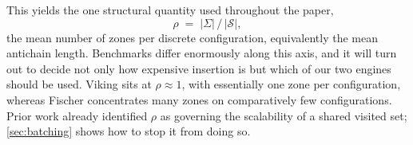 This yields the one structural quantity used throughout the paper,
\[
  \rho \;=\; |\Sigma| \,/\, |\mathcal{S}|,
\]
the mean number of zones per discrete configuration, equivalently the mean antichain length.
Benchmarks differ enormously along this axis, and it will turn out to decide not only how
expensive insertion is but which of our two engines should be used. Viking sits at
$\rho \approx 1$, with essentially one zone per configuration, whereas Fischer concentrates
many zones on comparatively few configurations. Prior work already identified $\rho$ as
governing the scalability of a shared visited set; \cref{sec:batching} shows how to stop it
from doing so.

